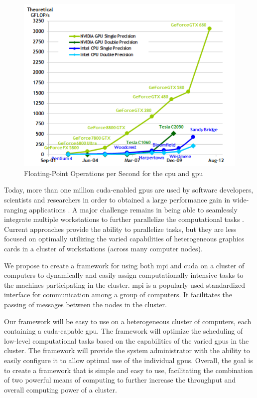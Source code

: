\begin{figure}[htb]
\centering
\includegraphics[scale=0.75]{img/floatingPoint.png}
\caption{Floating-Point Operations per Second for the \gls{cpu} and
         \gls{gpu} \cite{website:cudaCProgrammingGuide}}
\label{fig:flops_gpu_vs_cpu}
\end{figure}

Today, more than one million \gls{cuda}-enabled \glspl{gpu} are used by
software developers, scientists and researchers in order to obtained a large
performance gain in wide-ranging applications
\cite{website:cudaCProgrammingGuide}. A major challenge remains in being
able to seamlessly integrate multiple workstations to further parallelize the
computational tasks \cite{hadri2010identifying} \cite{hindman2009common}.
Current approaches provide the ability to parallelize tasks, but they are less
focused on optimally utilizing the varied capabilities of heterogeneous
graphics cards in a cluster of workstations (across many computer nodes).

We propose to create a framework for using both \Gls{mpi} and \gls{cuda} on a
cluster of computers to dynamically and easily assign computationally intensive
tasks to the machines participating in the cluster. \Gls{mpi} is a popularly
used standardized interface for communication among a group of computers. It
facilitates the passing of messages between the nodes in the cluster.

Our framework will be easy to use on a heterogeneous cluster of computers, each
containing a \Gls{cuda}-capable \gls{gpu}\@. The framework will optimize the
scheduling of low-level computational tasks based on the capabilities of the
varied \glspl{gpu} in the cluster. The framework will provide the system
administrator with the ability to easily configure it to allow optimal use of
the individual \glspl{gpu}. Overall, the goal is to create a framework that is
simple and easy to use, facilitating the combination of two powerful means of
computing to further increase the throughput and overall computing power of a
cluster.

